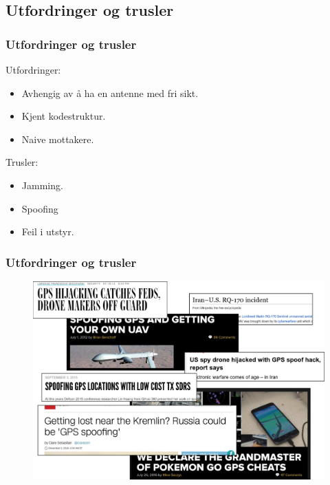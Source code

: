 \documentclass[xcolor=table]{beamer}
\begin{document}
\subsection{Utfordringer og trusler}
\begin{frame}
\frametitle{Utfordringer og trusler}
  Utfordringer:
  \begin{itemize}
    \item Avhengig av å ha en antenne med fri sikt.
    \item Kjent kodestruktur.
    \item Naive mottakere.
  \end{itemize}
  Trusler:
  \begin{itemize}
    \item Jamming.
    \item Spoofing
    \item Feil i utstyr.
  \end{itemize} 
\end{frame}

\begin{frame}
\frametitle{Utfordringer og trusler}
      \begin{figure}
        \includegraphics[scale=0.15]{thesis/graphics/montage.pdf}
      \end{figure} 
\end{frame}
\end{document}
